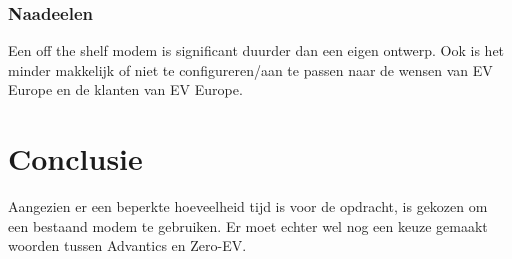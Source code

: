 \subsubsection{Naadeelen}

Een off the shelf modem is significant duurder dan een eigen ontwerp. Ook is
het minder makkelijk of niet te configureren/aan te passen naar de wensen van
EV Europe en de klanten van EV Europe.

\section{Conclusie}

Aangezien er een beperkte hoeveelheid tijd is voor de opdracht, is gekozen om
een bestaand modem te gebruiken. Er moet echter wel nog een keuze gemaakt
woorden tussen Advantics en Zero-EV.